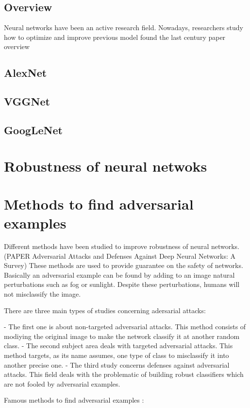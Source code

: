 \subsection{Overview}
Neural networks have been an active research field. Nowadays, researchers study how to optimize and improve previous model found the last century  paper overview
\subsection {AlexNet}
\subsection {VGGNet}
\subsection {GoogLeNet}
\section{Robustness of neural netwoks}



\section{Methods to find adversarial examples}

Different methods have been studied to improve robustness of neural networks. (PAPER Adversarial Attacks and Defenses Against Deep Neural Networks: A Survey)
These methods are used to provide guarantee on the safety of networks. Basically an adversarial example can be found by adding to an image natural perturbations such as fog or sunlight. Despite these perturbations, humans will not misclassify the image.

There are three main types of studies concerning adersarial attacks:

- The first one is about non-targeted adversarial attacks. This method consists of modiying the original image to make the network classify it at another random class.
- The second subject area deals with targeted adversarial attacks. This method targets, as its name assumes, one type of class to misclassify it into another precise one.
- The third study concerns defenses against adversarial attacks. This field deals with the problematic of building robust classifiers which are not fooled by adversarial examples. 

Famous methods to find adversarial examples :

